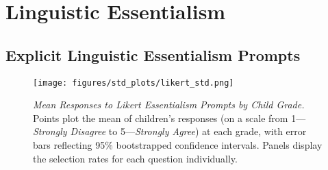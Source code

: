 \documentclass[11pt, floatsintext]{article}
\begin{document}
%
%
%
%
%






















\clearpage

\section*{Linguistic Essentialism}
\subsection*{Explicit Linguistic Essentialism Prompts}
\begin{figure}[h!]
    \centering
    \texttt{[image: figures/std\_plots/likert\_std.png]}
    \caption{\textit{Mean Responses to Likert Essentialism Prompts by Child Grade.} Points plot the mean of children's responses (on a scale from 1---\textit{Strongly Disagree} to 5---\textit{Strongly Agree}) at each grade, with error bars reflecting 95\% bootstrapped confidence intervals. 
    Panels display the selection rates for each question individually.}
    \label{fig:likert}
\end{figure}
\end{document}
